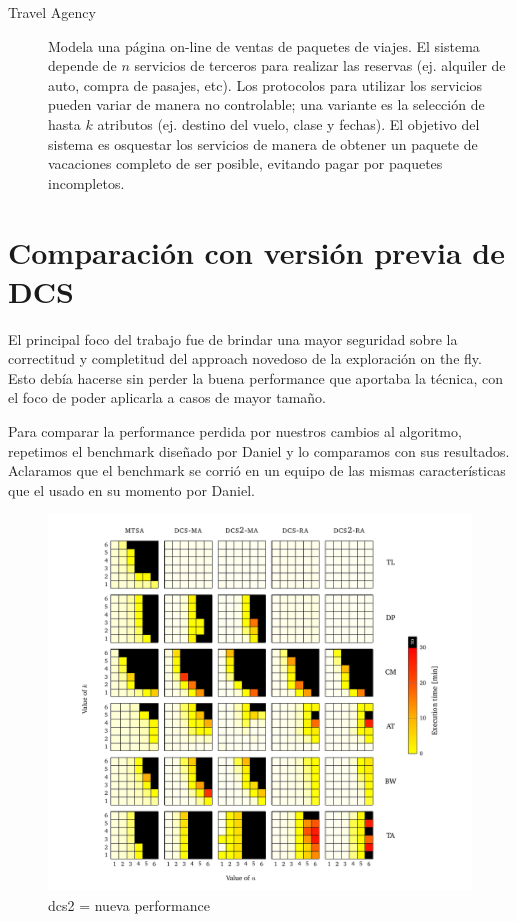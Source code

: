\begin{description}
    \item [Travel Agency] Modela una página on-line de ventas de paquetes de viajes. El sistema depende de $n$ servicios de terceros para realizar las reservas (ej. alquiler de auto, compra de pasajes, etc). Los protocolos para utilizar los servicios pueden variar de manera no controlable; una variante es la selección de hasta $k$ atributos (ej. destino del vuelo, clase y fechas). El objetivo del sistema es osquestar los servicios de manera de obtener un paquete de vacaciones completo de ser posible, evitando pagar por paquetes incompletos.
\end{description}

\section{Comparación con versión previa de DCS}
El principal foco del trabajo fue de brindar una mayor seguridad sobre la correctitud y completitud del approach novedoso de la exploración on the fly. Esto debía hacerse sin perder la buena performance que aportaba la técnica, con el foco de poder aplicarla a casos de mayor tamaño.

Para comparar la performance perdida por nuestros cambios al algoritmo, repetimos el benchmark diseñado por Daniel y lo comparamos con sus resultados. Aclaramos que el benchmark se corrió en un equipo de las mismas características que el usado en su momento por Daniel.

\begin{figure}[htb]
    \centering
    \includegraphics[width=\linewidth]{figures/dcs_vs.pdf}  
    \caption{dcs2 = nueva performance}
    \label{fig:dcs_vs}
\end{figure}


